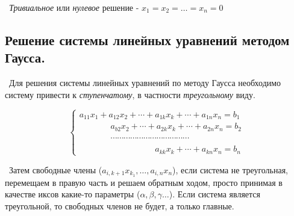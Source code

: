\medskip\noindent \textasteriskcentered~\textit{Тривиальное }или \textit{нулевое} решение - $x_1 = x_2 = \dots = x_n = 0$ 


\subsection*{Решение системы линейных уравнений методом Гаусса.}

\noindent \textbullet~Для решения системы линейных уравнений по методу Гаусса необходимо систему привести к \textit{ступенчатому}, в частности \textit{треугольному} виду.

\begin{equation*}
    \begin{cases}
        a_{11} x_1 + a_{12} x_2 + \cdots + a_{1k} x_k + \cdots + a_{1n} x_n = b_1 \\
        \phantom{a_11 x_1 +~} a_{b2} x_2 + \cdots + a_{2k} x_k + \cdots + a_{2n} x_n = b_2 \\
         \phantom{a_11 x_1 +~} \cdots \cdots \cdots \cdots \cdots \cdots \cdots \cdots \cdots \cdots \cdots \cdots \\
         \phantom{a_{11} x_1 + a_{12} x_2 + \cdots + } a_{kk} x_k + \cdots + a_{kn} x_n = b_n \end{cases}
\end{equation*}

\noindent \textbullet~Затем свободные члены ($a_{i, k+1} x_{k_1}, \dots, a_{i, n} x_{n}$), если система не треугольная, перемещаем в правую часть и решаем обратным ходом, просто принимая в качестве иксов какие-то параметры ($\alpha, \beta, \gamma \dots$). Если система является треугольной, то свободных членов не будет, а только главные.